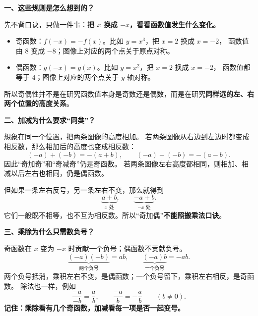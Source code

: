 \clearpage
\begin{explanationbox}
\textbf{\textcolor{CExplanation}{一、这些规则是怎么想到的？}}



先不背口诀，只做一件事：\textbf{把 $x$ 换成 $-x$，看看函数值发生什么变化。}

\begin{itemize}[leftmargin=*,itemsep=0.3em,topsep=0.3em]
\item 奇函数：$f(-x)=-f(x)$。比如 $y=x^3$，把 $x=2$ 换成 $x=-2$，
函数值由 $8$ 变成 $-8$；图像上对应的两个点关于原点对称。
\item 偶函数：$g(-x)=g(x)$。比如 $y=x^2$，把 $x=2$ 换成 $x=-2$，
函数值都等于 $4$；图像上对应的两个点关于 $y$ 轴对称。
\end{itemize}

所以奇偶性并不是在研究函数值本身是奇数还是偶数，而是在研究\textbf{同样远的左、右两个位置的高度关系}。

\medskip

\end{explanationbox}
\clearpage
\begin{explanationbox}
\textbf{\textcolor{CExplanation}{二、加减为什么要求“同类”？}}



想象在同一个位置，把两条图像的高度相加。
若两条图像从右边到左边时都变成相反数，那么相加后的高度也变成相反数：
\[
(-a)+(-b)=-(a+b),\qquad(-a)-(-b)=-(a-b).
\]
因此“奇加奇”和“奇减奇”仍是奇函数。
若两条图像左右高度都相同，则相加、相减以后左右也相同，仍是偶函数。

但如果一条左右反号，另一条左右不变，那么就得到
\[
\underbrace{a+b}_{x\text{ 处}},\qquad
\underbrace{-a+b}_{-x\text{ 处}}.
\]
它们一般既不相等，也不互为相反数。所以“奇加偶”\textbf{不能照搬乘法口诀}。

\medskip

\end{explanationbox}
\clearpage
\begin{explanationbox}
\textbf{\textcolor{CExplanation}{三、乘除为什么只需数负号？}}



奇函数在 $x$ 变为 $-x$ 时贡献一个负号；偶函数不贡献负号。
\[
\underbrace{(-a)(-b)}_{\text{两个负号}}=ab,\qquad
\underbrace{(-a)b}_{\text{一个负号}}=-ab.
\]
两个负号抵消，乘积左右不变，是偶函数；一个负号留下，乘积左右相反，是奇函数。
除法也一样，例如
\[
\frac{-a}{-b}=\frac ab,\qquad \frac{-a}{b}=-\frac ab
\qquad(b\ne0).
\]
\textbf{记住：乘除看有几个奇函数，加减看每一项是否一起变号。}

\medskip

\end{explanationbox}
